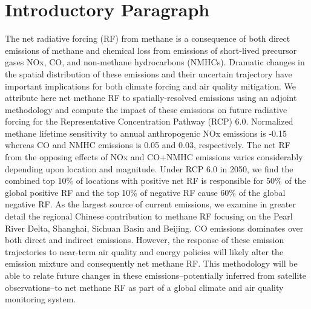 \section*{Introductory Paragraph}

The net radiative forcing (RF) from methane is a consequence of both direct emissions of methane and chemical loss from emissions of short-lived precursor gases NOx, CO, and non-methane hydrocarbons (NMHCs). Dramatic changes in the spatial distribution of these emissions and their uncertain trajectory have important implications for both climate forcing and air quality mitigation.  We attribute here net methane RF  to spatially-resolved emissions using an adjoint methodology and compute the impact of these emissions on future radiative forcing for the Representative Concentration Pathway (RCP) 6.0.  Normalized methane lifetime sensitivity  to annual anthropogenic NOx emissions is -0.15 whereas  CO and NMHC emissions is 0.05 and 0.03, respectively. The net RF from the opposing effects of NOx and CO+NMHC emissions varies considerably depending upon location and magnitude.  Under RCP 6.0 in 2050,  we find the combined top 10\% of locations with positive net RF is responsible for 50\% of the global positive RF and the top 10\% of negative RF  cause 60\% of the global negative RF. As the largest source of current emissions, we examine in greater detail the regional Chinese contribution to methane RF focusing on the Pearl River Delta, Shanghai, Sichuan Basin and Beijing.  CO emissions dominates over both direct and indirect emissions. However, the response of these emission trajectories to near-term air quality and energy policies will likely alter the emission mixture and consequently net methane RF. This methodology will be able to relate future changes in these emissions--potentially inferred from satellite observations--to net methane RF  as part of a global climate and air quality monitoring system. 